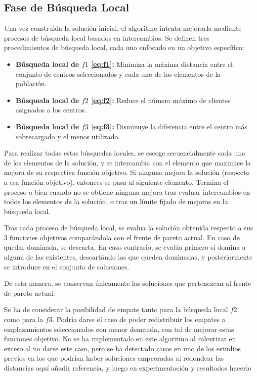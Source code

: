 \documentclass[12pt,a4paper]{book}
\begin{document}
\subsection{Fase de Búsqueda Local}
Una vez construida la solución inicial, el algoritmo intenta mejorarla mediante procesos de búsqueda local basados en intercambios.
Se definen tres procedimientos de búsqueda local, cada uno enfocado en un objetivo específico:  

\begin{itemize}
    \item \textbf{Búsqueda local  de $f1$ \ref{eq:f1}:} Minimiza la máxima distancia entre el conjunto de centros seleccionados y cada uno de los elementos de la población.
    \item \textbf{Búsqueda local de $f2$ \ref{eq:f2}:} Reduce el número máximo de clientes asignados a los centros.
    \item \textbf{Búsqueda local de $f3$ \ref{eq:f3}:} Disminuye la diferencia entre el centro más sobrecargado y el menos utilizado.
\end{itemize}

Para realizar todas estas búsquedas locales, se escoge secuencialmente cada uno de los elementos de la solución, y se intercambia con el elemento que maximice la mejora de su respectiva función objetivo. Si ninguno mejora la solución (respecto a esa función objetivo), entonces se pasa al siguiente elemento. 
Termina el proceso o bien cuando no se obtiene ninguna mejora tras evaluar intercambios en todos los elementos de la solución, o tras un límite fijado de mejoras en la búsqueda local.

Tras cada proceso de búsqueda local, se evalua la solución obtenida respecto a sus 3 funciones objetivos comparándola con el frente de pareto actual. En caso de quedar dominada, se descarta. En caso contrario, se evalúa primero si domina a alguna de las existentes, descartándo las que queden dominadas,
y posteriormente se introduce en el conjunto de soluciones.

De esta manera, se conservan únicamente las soluciones que pertenezcan al frente de pareto actual.

Se ha de considerar la posibilidad de empate tanto para la búsqueda local $f2$ como para la $f3$. Podría darse el caso de poder redistribuir los empates a emplazamientos seleccionados
con menor demanda, con tal de mejorar estas funciones objetivo. No se ha implementado en este algoritmo al ralentizar en exceso al no darse este caso, pero se ha detectado casos en uno de los estudios previos en los que podrían haber
soluciones empeoradas al redondear las distancias \color{red} aquí añadir referencia, y luego en experimentación y resultados hacerlo\color{black}
\end{document}
